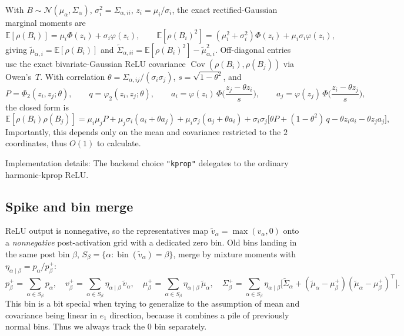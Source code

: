 \documentclass[11pt]{article}
\newcommand{\E}{\mathbb{E}}
\newcommand{\Cov}{\operatorname{Cov}}
\newcommand{\N}{\mathcal{N}}
\newcommand{\relu}{\rho}
\begin{document}
With $B \sim \N(\mu_\alpha, \Sigma_\alpha)$, $\sigma_i^2 = \Sigma_{\alpha, ii}$, $z_i = \mu_i / \sigma_i$, the exact rectified-Gaussian marginal moments are
\[
\E[\relu(B_i)] = \mu_i \Phi(z_i) + \sigma_i \varphi(z_i), \qquad
\E[\relu(B_i)^2] = (\mu_i^2 + \sigma_i^2)\Phi(z_i) + \mu_i \sigma_i \varphi(z_i),
\]
giving $\tilde\mu_{\alpha,i} = \E[\relu(B_i)]$ and $\tilde\Sigma_{\alpha, ii} = \E[\relu(B_i)^2] - \tilde\mu_{\alpha,i}^2$. Off-diagonal entries use the exact bivariate-Gaussian ReLU covariance $\Cov(\relu(B_i), \relu(B_j))$ via Owen's~$T$. 
With correlation $\theta = \Sigma_{\alpha,ij} / (\sigma_i \sigma_j)$, $s = \sqrt{1 - \theta^2}$, and
\[
P = \Phi_2(z_i, z_j; \theta), \qquad
q = \varphi_2(z_i, z_j; \theta), \qquad
a_i = \varphi(z_i)\, \Phi\!\Big( \frac{z_j - \theta z_i}{s} \Big), \qquad
a_j = \varphi(z_j)\, \Phi\!\Big( \frac{z_i - \theta z_j}{s} \Big),
\]
the closed form is
\begin{equation}
\E[\relu(B_i)\relu(B_j)]
= \mu_i \mu_j P + \mu_j \sigma_i (a_i + \theta a_j) + \mu_i \sigma_j (a_j + \theta a_i)
+ \sigma_i \sigma_j \big[ \theta P + (1 - \theta^2)\, q - \theta z_i a_i - \theta z_j a_j \big],
\label{eq:bvnrelu}
\end{equation}
Importantly, this depends only on the mean and covariance restricted to the $2$ coordinates, thus $O(1)$ to calculate.

Implementation details: The backend choice \texttt{"kprop"} delegates to the ordinary harmonic-kprop ReLU.

\subsection{Spike and bin merge}
ReLU output is nonnegative, so the representatives map $\tilde v_\alpha = \max(v_\alpha, 0)$ onto a \emph{nonnegative} post-activation grid with a dedicated zero bin. Old bins landing in the same post bin $\beta$, $S_\beta = \{\alpha : \operatorname{bin}(\tilde v_\alpha) = \beta\}$, merge by mixture moments with $\eta_{\alpha\mid\beta} = p_\alpha / p^+_\beta$:
\begin{equation}
p^+_\beta = \sum_{\alpha \in S_\beta} p_\alpha, \quad
v^+_\beta = \sum_{\alpha \in S_\beta} \eta_{\alpha\mid\beta}\, \tilde v_\alpha, \quad
\mu^+_\beta = \sum_{\alpha \in S_\beta} \eta_{\alpha\mid\beta}\, \tilde\mu_\alpha, \quad
\Sigma^+_\beta = \sum_{\alpha \in S_\beta} \eta_{\alpha\mid\beta} \big[ \tilde\Sigma_\alpha
+ (\tilde\mu_\alpha - \mu^+_\beta)(\tilde\mu_\alpha - \mu^+_\beta)^\top \big].
\end{equation}
This bin is a bit special when trying to generalize to the assumption of mean and covariance being linear in $e_1$ direction, because it combines a pile of previously normal bins.
Thus we always track the $0$ bin separately. 
\end{document}
